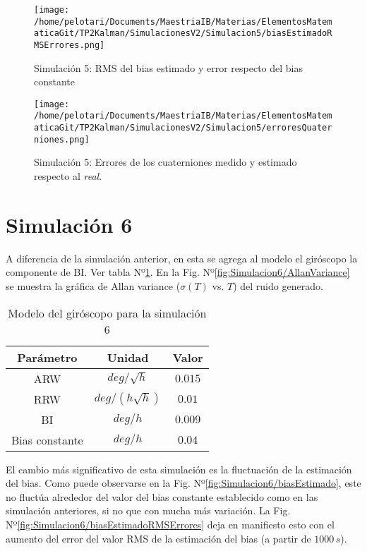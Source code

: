 \documentclass[a4paper,11pt,twoside]{IT-CNEA}
\begin{document}
\begin{figure}[h!]
\centering
\texttt{[image: /home/pelotari/Documents/MaestriaIB/Materias/ElementosMatematicaGit/TP2Kalman/SimulacionesV2/Simulacion5/biasEstimadoRMSErrores.png]}
\caption{Simulación 5:  RMS del bias estimado y error respecto del bias constante}
\label{fig:Simulacion5/biasEstimadoRMSErrores}
\end{figure}
\begin{figure}[h!]
\centering
\texttt{[image: /home/pelotari/Documents/MaestriaIB/Materias/ElementosMatematicaGit/TP2Kalman/SimulacionesV2/Simulacion5/erroresQuaterniones.png]}
\caption{Simulación 5:  Errores de los cuaterniones medido y estimado respecto al \textit{real}.}
\label{fig:Simulacion5/erroresQuaterniones}
\end{figure}
\section{Simulación 6}
A diferencia de la simulación anterior, en esta se agrega al modelo el giróscopo la componente de BI. Ver tabla Nº\ref{tabla:modeloGyroRLGSimulacion6}. En la Fig. Nº\ref{fig:Simulacion6/AllanVariance} se muestra la gráfica de Allan variance ($\sigma(T)$ vs. $T$) del ruido generado. 
\begin{table}[h!]
\centering
\caption{Modelo del giróscopo para la simulación 6}
\label{tabla:modeloGyroRLGSimulacion6}
\begin{tabular}{|c|c|c|}
\hline
Parámetro & Unidad& Valor\\ \hline
ARW&$deg/\sqrt{h}$&$0.015$ \\ \hline
RRW&$deg/\left(h\sqrt{h}\right)$&$0.01$ \\ \hline
BI&$deg/h$&$0.009$ \\ \hline
Bias constante&$deg/h$&$0.04$ \\ \hline
\end{tabular}
\end{table}
\par El cambio más significativo de esta simulación es la fluctuación de la estimación del bias. Como puede observarse en la Fig. Nº\ref{fig:Simulacion6/biasEstimado}, este no fluctúa alrededor del valor del bias constante establecido como en las simulación anteriores, si no que con mucha más variación. La Fig. Nº\ref{fig:Simulacion6/biasEstimadoRMSErrores} deja en manifiesto esto con el aumento del error del valor RMS de la estimación del bias (a partir de $1000\,s$).
\end{document}

